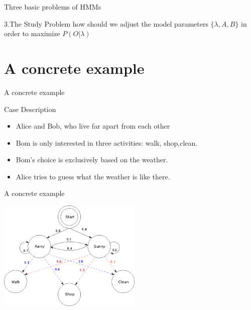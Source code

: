 \documentclass{beamer}
\begin{document}
\begin{frame}{Three basic problems of HMMs}
    \begin{block}{3.\quad The Study Problem}
     how should we adjust the model parameters $\{\lambda, A, B\}$ in order to maximize $P(O|\lambda)$
    \end{block}
\end{frame}

\section{A concrete example}
\begin{frame}{A concrete example}
    \begin{block}{Case Description}
        \begin{itemize}
        \item Alice and Bob, who live far apart from each other
        \item Bom is only interested in three activities: walk, shop,clean.
        \item Bom's choice is exclusively based on the weather.
        \item Alice tries to guess what the weather is like there.
        \end{itemize}
    \end{block}
\end{frame}

\begin{frame}{A concrete example}
    \begin{center}
    \includegraphics[height=150pt]{400px-HMMGraph.svg.png}
    \end{center}
\end{frame}
\end{document}
